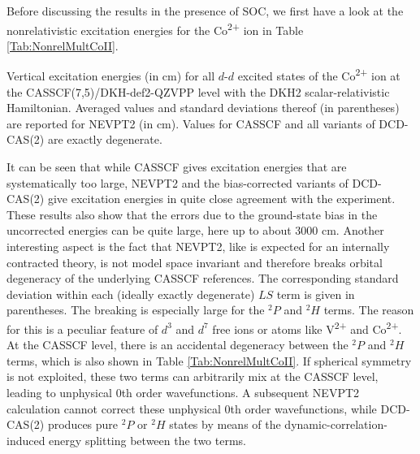 Before discussing the results in the presence of SOC, we first have a look at the nonrelativistic excitation energies for the Co\textsuperscript{2+} ion in Table \ref{Tab:NonrelMultCoII}.
\begin{table}
\small
\centering
\ttabbox
{\caption[Vertical excitation energies for all $d$-$d$ excited states of the Co\textsuperscript{2+} ion.]{Vertical excitation energies (in cm\textsuperscript{}) for all $d$-$d$ excited states of the Co\textsuperscript{2+} ion at the CASSCF(7,5)/DKH-def2-QZVPP level with the DKH2 scalar-relativistic Hamiltonian. Averaged values and standard deviations thereof (in parentheses) are reported for NEVPT2 (in cm\textsuperscript{}). Values for CASSCF and all variants of DCD-CAS(2) are exactly degenerate.}
\label{Tab:NonrelMultCoII}}
{}
\end{table}
It can be seen that while CASSCF gives excitation energies that are systematically too large, NEVPT2 and the bias-corrected variants of DCD-CAS(2) give excitation energies in quite close agreement with the experiment. These results also show that the errors due to the ground-state bias in the uncorrected energies can be quite large, here up to about 3000 cm\textsuperscript{}. Another interesting aspect is the fact that NEVPT2, like is expected for an internally contracted theory, is not model space invariant and therefore breaks orbital degeneracy of the underlying CASSCF references. The corresponding standard deviation within each (ideally exactly degenerate) $LS$ term is given in parentheses. The breaking is especially large for the $^2P$ and $^2H$ terms. The reason for this is a peculiar feature of $d^3$ and $d^7$ free ions or atoms like V\textsuperscript{2+} and Co\textsuperscript{2+}. At the CASSCF level, there is an accidental degeneracy between the $^2P$ and $^2H$ terms, which is also shown in Table \ref{Tab:NonrelMultCoII}. If spherical symmetry is not exploited, these two terms can arbitrarily mix at the CASSCF level, leading to unphysical 0th order wavefunctions. A subsequent NEVPT2 calculation cannot correct these unphysical 0th order wavefunctions, while DCD-CAS(2) produces pure $^2P$ or $^2H$ states by means of the dynamic-correlation-induced energy splitting between the two terms.

